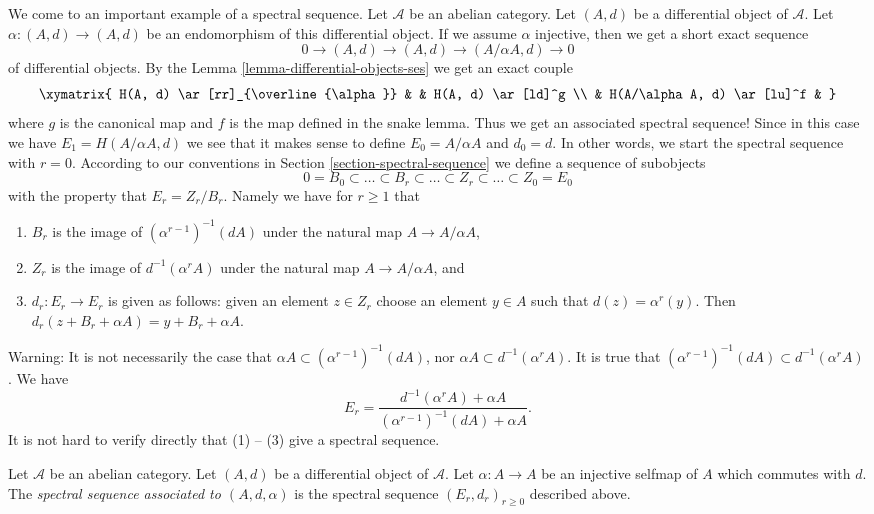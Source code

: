 \noindent
We come to an important example of a spectral sequence.
Let $\mathcal{A}$ be an abelian category.
Let $(A, d)$ be a differential object of $\mathcal{A}$.
Let $\alpha : (A, d) \to (A, d)$ be an endomorphism of this differential
object. If we assume $\alpha$ injective, then we get a short exact sequence
$$
0 \to (A, d) \to (A, d) \to (A/\alpha A, d) \to 0
$$
of differential objects. By the
Lemma \ref{lemma-differential-objects-ses} we get an exact couple
$$
\xymatrix{
H(A, d) \ar[rr]_{\overline{\alpha}} & & H(A, d) \ar[ld]^g \\
& H(A/\alpha A, d) \ar[lu]^f &
}
$$
where $g$ is the canonical map and $f$ is the map defined in the snake lemma.
Thus we get an associated spectral sequence!
Since in this case we have $E_1 = H(A/\alpha A, d)$ we
see that it makes sense to define $E_0 = A/\alpha A$
and $d_0 = d$. In other words, we start the spectral sequence
with $r = 0$. According to our conventions in
Section \ref{section-spectral-sequence} we define a sequence of subobjects
$$
0 = B_0 \subset \ldots \subset B_r \subset \ldots
\subset Z_r \subset \ldots \subset Z_0 = E_0
$$
with the property that $E_r = Z_r/B_r$. Namely we have
for $r \geq 1$ that
\begin{enumerate}
\item $B_r$ is the image of $(\alpha^{r - 1})^{-1}(d A)$
under the natural map $A \to A/\alpha A$,
\item $Z_r$ is the image of $d^{-1}(\alpha^r A)$
under the natural map $A \to A/\alpha A$, and
\item $d_r : E_r \to E_r$ is given as follows: given an element $z \in Z_r$
choose an element $y \in A$ such that $d(z) = \alpha^r(y)$. Then
$d_r(z + B_r + \alpha A) = y + B_r + \alpha A$.
\end{enumerate}
Warning: It is not necessarily the case that
$\alpha A \subset (\alpha^{r - 1})^{-1}(dA)$, nor
$\alpha A \subset d^{-1}(\alpha^r A)$. It is true that
$(\alpha^{r - 1})^{-1}(dA) \subset d^{-1}(\alpha^r A)$.
We have
$$
E_r
=
\frac{d^{-1}(\alpha^r A) + \alpha A}{(\alpha^{r - 1})^{-1}(dA) + \alpha A}.
$$
It is not hard to verify directly that (1) -- (3) give a spectral sequence.

\begin{definition}
\label{definition-differential-object-selfmap}
Let $\mathcal{A}$ be an abelian category.
Let $(A, d)$ be a differential object of $\mathcal{A}$.
Let $\alpha : A \to A$ be an injective selfmap of $A$ which
commutes with $d$. The {\it spectral sequence associated to
$(A, d, \alpha)$} is the spectral sequence
$(E_r, d_r)_{r \geq 0}$ described above.
\end{definition}

